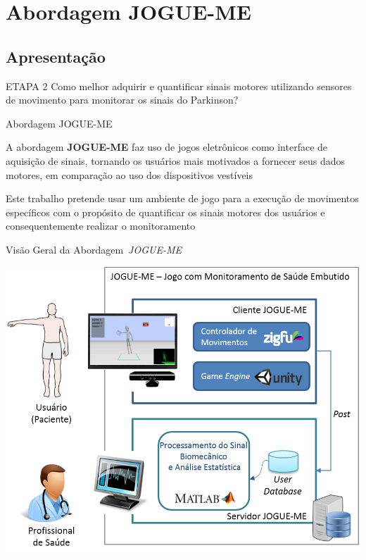 \documentclass{beamer}
\begin{document}
\section{Abordagem JOGUE-ME}


\subsection{Apresentação}
\begin{frame}
  \begin{block}{ETAPA 2}
   Como melhor adquirir e quantificar sinais motores utilizando sensores de movimento para monitorar os sinais do Parkinson?
  \end{block}
\end{frame}

\begin{frame}{Abordagem JOGUE-ME}
    \begin{block}{}
    A abordagem \textbf{JOGUE-ME} faz uso de jogos eletrônicos como interface de aquisição de sinais, tornando os usuários mais motivados a fornecer seus dados motores, em comparação ao uso dos dispositivos vestíveis
    \end{block}
    
    
    \begin{block}{}
    Este trabalho pretende usar um ambiente de jogo para a execução de movimentos específicos com o propósito de quantificar os sinais motores dos usuários e consequentemente realizar o monitoramento
    \end{block}
\end{frame}

\begin{frame}{Visão Geral da Abordagem~\textit{JOGUE-ME}}
  \begin{block}{}
      \center \includegraphics[height=2.2 in]{img/visaosistema.png}
  \end{block}
\end{frame}
\end{document}
